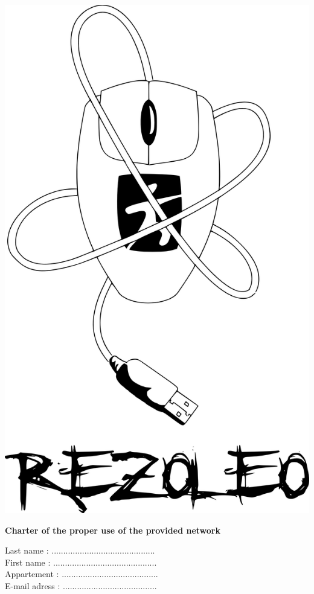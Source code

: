 \documentclass[12pt]{article}
\begin{document}
	
\thispagestyle{empty}

\begin{minipage}{0.15\linewidth}
	\includegraphics[scale=0.15]{rezoleo.png}
\end{minipage}\hfill
\begin{minipage}{0.80\linewidth}
{\huge \textbf{Charter of the proper use of the provided network}}
\end{minipage}


\begin{flushright}

	Last name : ............................................\\
	First name : ............................................\\
	Appartement : .........................................\\
	E-mail adress : ........................................\\

\end{flushright}
\end{document}
